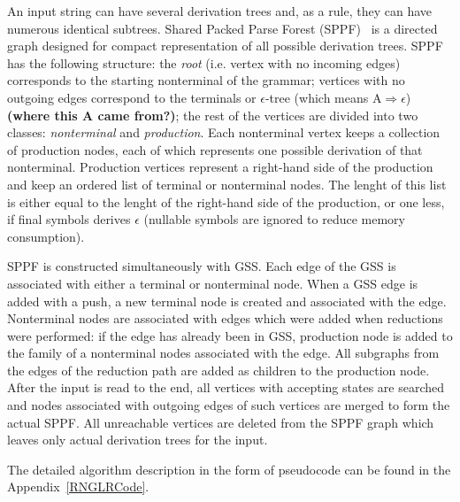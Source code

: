 An input string can have several derivation trees and, as a rule, they can have 
numerous identical subtrees. Shared Packed Parse Forest (SPPF)~\cite{SPPF} is a directed graph
designed for compact representation of all possible derivation trees.  
SPPF has the following structure: the \emph{root} (i.e. vertex with no incoming edges) corresponds 
to the starting nonterminal of the grammar; vertices with no outgoing edges correspond to the terminals 
or $\epsilon$-tree (which means $\mathrm{A} \Rightarrow \epsilon$) {\bf (where this A came from?)}; 
the rest of the vertices are divided into two classes: \emph{nonterminal} and \emph{production}. 
Each nonterminal vertex keeps a collection of production nodes, each of which represents one  
possible derivation of that nonterminal. Production vertices represent a right-hand side of the 
production and keep an ordered list of terminal or nonterminal nodes. The lenght of this list is 
either equal to the lenght of the right-hand side of the production, or one less, if final 
symbols derives $\epsilon$ (nullable symbols are ignored to reduce memory consumption). 

SPPF is constructed simultaneously with GSS. Each edge of the GSS is associated with either 
a terminal or nonterminal node. When a GSS edge is added with a push, 
a new terminal node is created and associated with the edge. Nonterminal nodes are associated
with edges which were added when reductions were performed: if the edge has already been in GSS, 
production node is added to the family of a nonterminal nodes associated with the edge. All subgraphs 
from the edges of the reduction path are added as children to the production node. After the input 
is read to the end, all vertices with accepting states are searched and nodes associated with 
outgoing edges of such vertices are merged to form the actual SPPF. All unreachable vertices 
are deleted from the SPPF graph which leaves only actual derivation trees for the input.

The detailed algorithm description in the form of pseudocode can be found in the 
Appendix~\ref{RNGLRCode}. 

